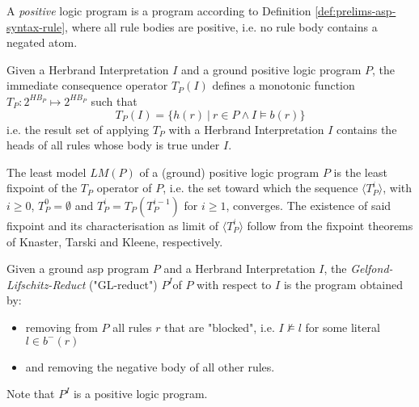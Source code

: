\begin{definition}
\label{def:prelims-asp-semantics-positive-program}
A \emph{positive} logic program is a program according to Definition \ref{def:prelims-asp-syntax-rule}, where all rule bodies are positive, i.e. no rule body contains a negated atom.
\end{definition}

\begin{definition}
\label{def:prelims-asp-semantics-immediate-consequence}
Given a Herbrand Interpretation $I$ and a ground positive logic program $P$, the immediate  consequence operator $T_P(I)$ defines a monotonic function $T_P: 2^{HB_P} \mapsto 2^{HB_P}$ such that
\[
	T_P(I) = \{h(r)\ |\ r \in P \land I \models b(r)\}
\]
i.e. the result set of applying $T_P$ with a Herbrand Interpretation $I$ contains the heads of all rules whose body is true under $I$.
\end{definition}

\begin{definition}
\label{def:prelims-asp-semantics-least-model}
The least model $LM(P)$ of a (ground) positive logic program $P$ is the least fixpoint of the $T_P$ operator  of $P$, i.e. the set toward which the sequence $\langle T^{i}_{P} \rangle$, with $i \geq 0$, $T^{0}_P = \emptyset$ and $T^{i}_P = T_P(T^{i-1}_P)$ for $i \geq 1$, converges. The existence of said fixpoint and its characterisation as limit of $\langle T^{i}_{P} \rangle$ follow from the fixpoint theorems of Knaster, Tarski and Kleene, respectively.
\end{definition}

\begin{definition}
\label{def:prelims-asp-semantics-gl-reduct}
Given a ground \gls{asp} program $P$ and a Herbrand Interpretation $I$, the \emph{Gelfond-Lifschitz-Reduct} ("GL-reduct") $P^{I}$of $P$ with respect to $I$ is the program obtained by:
\begin{itemize}
	\item removing from $P$ all rules $r$ that are "blocked", i.e. $I \not\models l$ for some literal $l \in b^{-}(r)$ 
	\item and removing the negative body of all other rules.
\end{itemize}
Note that $P^{I}$ is a positive logic program.
\end{definition}

